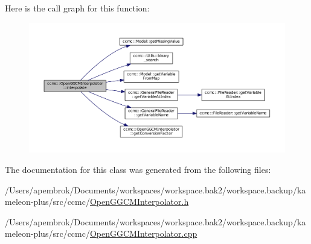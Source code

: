 Here is the call graph for this function\-:\nopagebreak
\begin{figure}[H]
\begin{center}
\leavevmode
\includegraphics[width=350pt]{classccmc_1_1_open_g_g_c_m_interpolator_ad7edc3f7862deda978513f923fc30c33_cgraph}
\end{center}
\end{figure}




The documentation for this class was generated from the following files\-:\begin{DoxyCompactItemize}
\item 
/\-Users/apembrok/\-Documents/workspaces/workspace.\-bak2/workspace.\-backup/kameleon-\/plus/src/ccmc/\hyperlink{_open_g_g_c_m_interpolator_8h}{Open\-G\-G\-C\-M\-Interpolator.\-h}\item 
/\-Users/apembrok/\-Documents/workspaces/workspace.\-bak2/workspace.\-backup/kameleon-\/plus/src/ccmc/\hyperlink{_open_g_g_c_m_interpolator_8cpp}{Open\-G\-G\-C\-M\-Interpolator.\-cpp}\end{DoxyCompactItemize}
